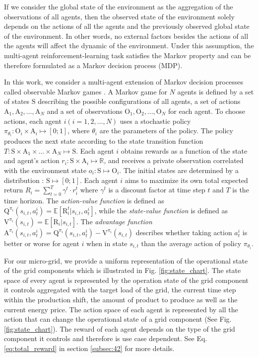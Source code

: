 If we consider the global state of the environment as the aggregation of the observations of all agents, then the observed state of the environment solely depends on the actions of all the agents and the previously observed global state of the environment. In other words, no external factors besides the actions of all the agents will affect the dynamic of the environment. Under this assumption, the multi-agent reinforcement-learning task satisfies the Markov property and can be therefore formulated as a Markov decision process (MDP).

In this work, we consider a multi-agent extension of Markov decision processes called observable Markov games \cite{Littman1994multiagent}. A Markov game for $N$ agents is defined by a set of states $\mathrm{S}$ describing the possible configurations of all agents, a set of actions $\mathrm{A}_1, \mathrm{A}_2, \ldots, \mathrm{A}_N$ and a set of observations $\mathrm{O}_1,\mathrm{O}_2, \ldots, \mathrm{O}_N$ for each agent. To choose actions, each agent $i ( i= 1,2,\ldots, N)$ uses a stochastic policy $\pi_{\theta_i} : \mathrm{O}_i \times \mathrm{A}_i \mapsto [0; 1]$, where $\theta_i$ are the parameters of the policy. The policy produces the next state according to the state transition function $T : \mathrm{S} \times  \mathrm{A}_1 \times ...  \times \mathrm{A}_N \mapsto \mathrm{S}$. Each agent $i$ obtains rewards as a function of the state and agent’s action $r_i : \mathrm{S} \times \mathrm{A}_i  \mapsto \mathbb{R}$, and receives a private observation correlated with the environment state $o_i : \mathrm{S} \mapsto \mathrm{O}_i$. The initial states are determined by a distribution  : $\mathrm{S} \mapsto [0; 1]$. Each agent $i$ aims to maximize its own total expected return $R_i = \sum_{t=0}^{T}{\gamma^t \cdot r_i^t}$ where $\gamma^t$ is a discount factor at time step $t$ and $T$ is the time horizon. The \textit{action-value function} is defined as $\mathrm{Q}^{\pi_i}(s_{i,t}, a_t^i)=\mathbb{E}[\mathrm{R}_i^t|s_{i,t},a_t^i]$, while the \textit{state-value function} is defined as $\mathrm{V}^{\pi_i}(s_{i,t})=\mathbb{E}[\mathrm{R}_i|s_{i,t}]$. The
\textit{advantage function} $\mathrm{A}^{\pi_i}(s_{i,t}, a_t^i) = \mathrm{Q}^{\pi_i}(s_{i,t}, a_t^i) - \mathrm{V}^{\pi_i}(s_{i,t})$ describes whether taking action $a_t^i$ is better or worse for agent $i$ when in state $s_{i,t}$ than the average action of policy $\pi_{\theta_i}$.

For our micro-grid, we provide a uniform representation of the operational state of the grid components which is illustrated in Fig. \ref{fig:state_chart}. The state space of every agent is represented by the operation state of the grid component it controls aggregated with the target load of the grid, the current  time step within  the production shift, the amount of product to produce as well as the current energy price. The action space of each agent is represented by all the action that can change the operational state of a grid component (See Fig. \ref{fig:state_chart}). The reward of each agent depends on the type of the grid component it controls and therefore is use case dependent. See Eq. \ref{eq:total_reward} in section \ref{subsec:42} for more details.

